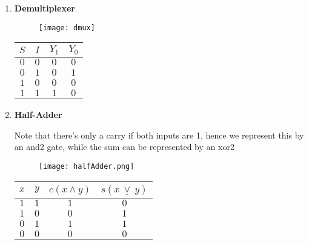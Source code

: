 \documentclass[english,course]{Notes}
\begin{document}
\begin{enumerate}
\newpage
\item \textbf{Demultiplexer}

	
	
		\begin{minipage}{\linewidth}
      \centering
      \begin{minipage}{0.45\linewidth}
          \begin{figure}[ht]
              \texttt{[image: dmux]}
          \end{figure}
      \end{minipage}
      \hspace{0.05\linewidth}
      \begin{minipage}{0.45\linewidth}
      \begin{tabular}{|c|c|c|c|}
		$S$ & $I$ & $Y_1$ & $Y_0$  \\
		\hline
		$0$ & $0$ & $0$ & $0$ \\
		$0$ & $1$ & $0$ & $1$ \\
		$1$ & $0$ & $0$ & $0$ \\
		$1$ & $1$ & $1$ & $0$ \\ 
	\end{tabular}
	\end{minipage}
\end{minipage}
	
	\item \textbf{Half-Adder}
	
	
	\par{Note that there's only a carry if both inputs are 1, hence we represent this by an and2 gate, while the sum can be represented by an xor2}
	
	\begin{minipage}{\linewidth}
      \centering
      \begin{minipage}{0.45\linewidth}
          \begin{figure}[ht]
              \texttt{[image: halfAdder.png]}
          \end{figure}
      \end{minipage}
      \hspace{0.05\linewidth}
      \begin{minipage}{0.45\linewidth}
      \begin{tabular}{|c|c|c|c|}
		$x$ & $y$ & $c (x \land y)$ & $s (x \ \underline{\lor}  \ y)$  \\
		\hline
		$1$ & $1$ & $1$ & $0$ \\
		$1$ & $0$ & $0$ & $1$ \\
		$0$ & $1$ & $1$ & $1$ \\
		$0$ & $0$ & $0$ & $0$ \\ 
	\end{tabular}
	\end{minipage}
	

\end{minipage}
\end{enumerate}
\end{document}
